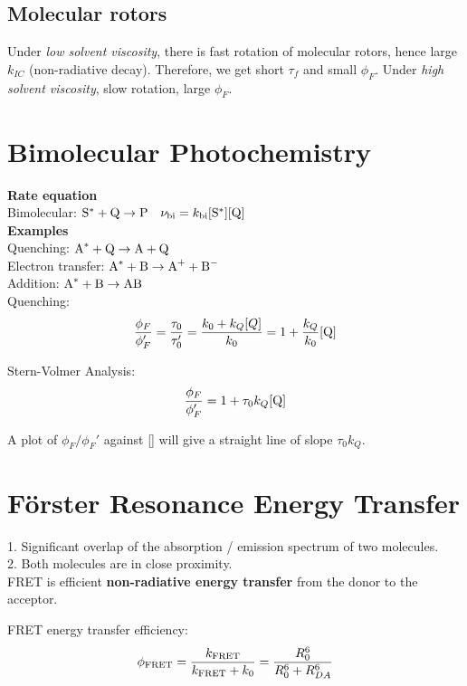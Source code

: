 \subsection*{Molecular rotors}
Under \textit{low solvent viscosity}, there is fast rotation of molecular rotors, hence large $k_{IC}$ (non-radiative decay). Therefore,
we get short $\tau_f$ and small $\phi_F$. Under \textit{high solvent viscosity}, slow rotation, large $\phi_F$.
\section{Bimolecular Photochemistry}
\textbf{Rate equation} \\
Bimolecular: $\ce{S}^{*} + \ce{Q} \rightarrow \ce{P} \quad \nu_{\mathrm{bi}} = k_{\mathrm{bi}} [\ce{S}^{*}][\ce{Q}]$\\

\textbf{Examples} \\
Quenching: $\ce{A^*} + \ce{Q} \rightarrow \ce{A} + \ce{Q}$ \\
Electron transfer: $\ce{A^*} + \ce{B} \rightarrow \ce{A+} + \ce{B-}$ \\
Addition: $\ce{A^*} + \ce{B} \rightarrow \ce{AB}$ \\

Quenching:
\begin{equation*}
  \frac{\phi_{F}}{\phi_{F}'} = \frac{\tau_0}{\tau_0'} = \frac{k_0 + k_Q[Q]}{k_0} = 1 + \frac{k_Q}{k_0}[\ce{Q}]
\end{equation*}

Stern-Volmer Analysis:
$$\frac{\phi_F}{\phi_F'} = 1 + \tau_0 k_Q[\ce{Q}]$$

A plot of $\phi_F/\phi_F'$ against [] will give a straight line of slope $\tau_0 k_Q$.
\vspace{\baselineskip}

\section{Förster Resonance Energy Transfer}
1. Significant overlap of the absorption / emission spectrum of two molecules. \\
2. Both molecules are in close proximity. \\
FRET is efficient \textbf{non-radiative energy transfer} from the donor to the acceptor.
\vspace{\baselineskip}

FRET energy transfer efficiency:
$$\phi_{\ce{FRET}} = \frac{k_{\ce{FRET}}}{k_{\ce{FRET}}+k_0} = \frac{R_0^6}{R_0^6+R_{DA}^6}$$

